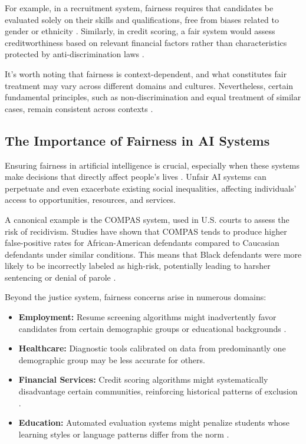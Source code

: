 \documentclass[12pt,a4paper,openright,twoside]{book}
\begin{document}
For example, in a recruitment system, fairness requires that candidates be evaluated solely on their skills and qualifications, free from biases related to gender or ethnicity \cite{Chen2023}. Similarly, in credit scoring, a fair system would assess creditworthiness based on relevant financial factors rather than characteristics protected by anti-discrimination laws \cite{algorithmicdiscrimination2024}.

It's worth noting that fairness is context-dependent, and what constitutes fair treatment may vary across different domains and cultures. Nevertheless, certain fundamental principles, such as non-discrimination and equal treatment of similar cases, remain consistent across contexts \cite{kuppler2021distributivejusticefairnessmetrics}.

\subsection{The Importance of Fairness in AI Systems}
Ensuring fairness in artificial intelligence is crucial, especially when these systems make decisions that directly affect people's lives \cite{corbett2023measure, yuan2024ensuringfairnesstransparentauditing}. Unfair AI systems can perpetuate and even exacerbate existing social inequalities, affecting individuals' access to opportunities, resources, and services.

A canonical example is the COMPAS system, used in U.S. courts to assess the risk of recidivism. Studies have shown that COMPAS tends to produce higher false-positive rates for African-American defendants compared to Caucasian defendants under similar conditions. This means that Black defendants were more likely to be incorrectly labeled as high-risk, potentially leading to harsher sentencing or denial of parole \cite{yuan2024ensuringfairnesstransparentauditing}.

Beyond the justice system, fairness concerns arise in numerous domains:

\begin{itemize}
    \item \textbf{Employment:} Resume screening algorithms 
    might inadvertently favor candidates from certain demographic 
    groups or educational backgrounds \cite{kheya2024pursuitfairnessartificialintelligence}.
    \item \textbf{Healthcare:} Diagnostic tools calibrated on data from predominantly one demographic group may be less accurate for others\cite{10749873}.
    \item \textbf{Financial Services:} Credit scoring algorithms might systematically disadvantage certain communities, reinforcing historical patterns of exclusion \cite{Ferrara2023}.
    \item \textbf{Education:} Automated evaluation systems might penalize students whose learning styles or language patterns differ from the norm \cite{kheya2024pursuitfairnessartificialintelligence}.
\end{itemize}
\end{document}

